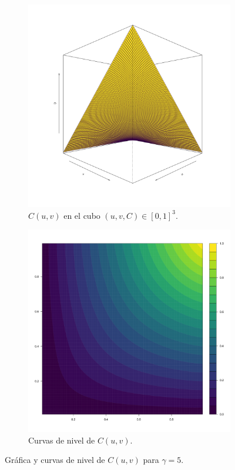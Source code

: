 \documentclass[11pt,a4paper]{article}
\begin{document}
\begin{figure}[!htb]
    \centering
    \begin{subfigure}[t]{0.45\textwidth}
        \centering
        \includegraphics[width=\linewidth]{copula_5.png}
        \caption{$C(u, v)$ en el cubo $(u, v, C) \in [0, 1]^3$.}
        \label{fig:copula_3d}
    \end{subfigure}
    \hfill
    \begin{subfigure}[t]{0.45\textwidth}
        \centering
        \includegraphics[width=\linewidth]{copula_5_contour.png} 
        \caption{Curvas de nivel de $C(u, v)$.}
        \label{fig:copula_contour}
    \end{subfigure}
    \caption{Gráfica y curvas de nivel de $C(u, v)$ para $\gamma = 5$.}
    \label{fig:copula}
\end{figure}
\end{document}
